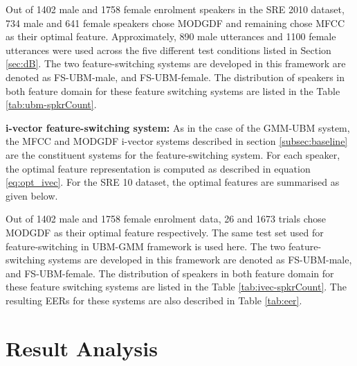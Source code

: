 \documentclass{article}
\begin{document}
Out of 1402 male  and 1758 female enrolment speakers in the SRE 2010
dataset, 734 male  and 641 female speakers chose MODGDF and 
remaining chose MFCC as their optimal feature. Approximately, 890
male utterances and 1100 female utterances were used across the five
different test conditions listed in Section \ref{sec:dB}. The two 
feature-switching systems are developed in this framework are denoted as 
FS-UBM-male, and FS-UBM-female. The distribution of speakers in both feature 
domain for these feature switching systems are listed in the Table \ref{tab:ubm-spkrCount}.


\textbf{i-vector feature-switching system:}
As in the case of the GMM-UBM system, the MFCC and MODGDF i-vector systems
described in section \ref{subsec:baseline} are the constituent systems for the
feature-switching system. For each speaker, the optimal feature representation
is computed as described in equation \ref{eq:opt_ivec}. For the SRE 10 dataset,
the optimal features are summarised as given below.

Out of 1402 male and 1758 female enrolment data, 26 and 1673
trials chose MODGDF as their optimal feature respectively.
The same test set used for feature-switching in UBM-GMM framework 
is used here. The two feature-switching systems are developed in this
framework are denoted as FS-UBM-male, and FS-UBM-female. The distribution 
of speakers in both feature domain for these feature switching systems 
are listed in the Table \ref{tab:ivec-spkrCount}. The resulting EERs for 
these systems are also described in Table \ref{tab:eer}.

\section{Result Analysis}
\label{subsec:resAnalysis}
\end{document}
